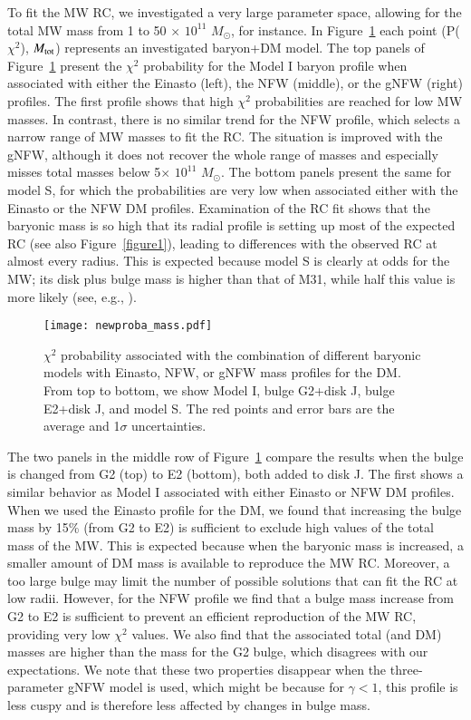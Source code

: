 \documentclass{aa}
\begin{document}
To fit the MW RC, we investigated a very large parameter space, allowing for the total MW mass from 1 to 50 $\times$ $10^{11}$ $M_{\odot}$, for instance. In Figure~\ref{fig:modelIpm} each point (P($\chi^2$), $M_{\rm tot}$) represents an investigated baryon+DM model. 
The top panels of Figure~\ref{fig:modelIpm} present the $\chi^2$ probability for the Model I baryon profile \citep{Pouliasis2017} when associated with either the Einasto (left), the NFW (middle), or the gNFW (right) profiles. The first profile shows that high $\chi^2$ probabilities are reached for low MW masses. In contrast, there is no similar trend for the NFW profile, which selects a narrow range of MW masses to fit the RC. The situation is improved with the gNFW, although it does not recover the whole range of masses and especially misses total masses below 5$\times$ $10^{11}$ $M_{\odot}$. The bottom panels present the same for model S, for which the probabilities are very low when associated either with the Einasto or the NFW DM profiles. Examination of the RC fit shows that the baryonic mass is so high that its radial profile is setting up most of the expected RC (see also Figure~\ref{figure1}), leading to differences with the observed RC at almost every radius. This is expected because model S is clearly at odds for the MW; its disk plus bulge mass is higher than that of M31, while half this value is more likely (see, e.g., \citealt{Hammer2007}).


\begin{figure}
\texttt{[image: newproba\_mass.pdf]}
    \caption{$\chi^2$ probability associated with the combination of different baryonic models with Einasto, NFW, or gNFW mass profiles for the DM. From top to bottom, we show Model I, bulge G2+disk J, bulge E2+disk J, and model S. The red points and error bars are the average and 1$\sigma$ uncertainties.}
    \label{fig:modelIpm}
\end{figure}


 The two panels in the middle row of Figure~\ref{fig:modelIpm} compare the results when the  bulge is changed from G2 (top) to E2 (bottom), both added to disk J. The first shows a similar behavior as Model I associated with either Einasto or NFW DM profiles. When we used the Einasto profile for the DM, we found that increasing the bulge mass by 15\% (from G2 to E2) is sufficient to exclude high values of the  total mass of the MW. This is expected because when the baryonic mass is increased, a smaller amount of DM mass is available to reproduce the MW RC. Moreover, a too large bulge may limit the number of possible solutions that can fit the RC at low radii. However, for the NFW profile we find that a bulge mass increase from G2 to E2 is sufficient to prevent an efficient reproduction of the MW RC, providing very low $\chi^2$ values. We also find that the associated total (and DM) masses are higher than the mass for the G2 bulge, which disagrees with our expectations. We note that these two properties disappear when the three-parameter gNFW model is used, which might be because for $\gamma < 1$, this profile is less cuspy and is therefore less affected by changes in bulge mass.
\end{document}
